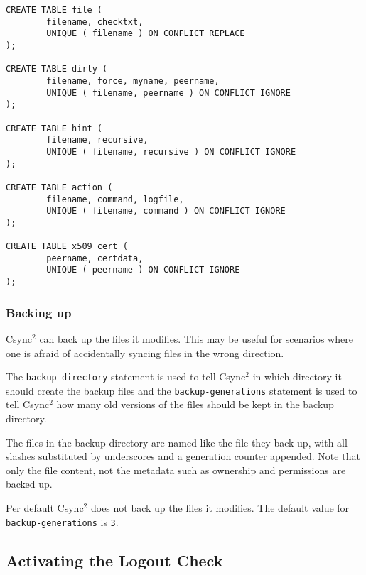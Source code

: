 \documentclass[a4paper,twocolumn]{article}
\def\csync2{{\sc Csync$^{2}$}}
\begin{document}
\begin{figure*}[t]
  \begin{center}
\begin{verbatim}
CREATE TABLE file (
        filename, checktxt,
        UNIQUE ( filename ) ON CONFLICT REPLACE
);

CREATE TABLE dirty (
        filename, force, myname, peername,
        UNIQUE ( filename, peername ) ON CONFLICT IGNORE
);

CREATE TABLE hint (
        filename, recursive,
        UNIQUE ( filename, recursive ) ON CONFLICT IGNORE
);

CREATE TABLE action (
        filename, command, logfile,
        UNIQUE ( filename, command ) ON CONFLICT IGNORE
);

CREATE TABLE x509_cert (
        peername, certdata,
        UNIQUE ( peername ) ON CONFLICT IGNORE
);
\end{verbatim}
  \end{center}
  \caption{The \csync2 database schema}
\end{figure*}


\subsubsection{Backing up}

\csync2 can back up the files it modifies. This may be useful for scenarios
where one is afraid of accidentally syncing files in the wrong direction.

The {\tt backup-directory} statement is used to tell \csync2 in which directory
it should create the backup files and the {\tt backup-generations} statement is
used to tell \csync2 how many old versions of the files should be kept in the
backup directory.

The files in the backup directory are named like the file they back up, with
all slashes substituted by underscores and a generation counter appended. Note
that only the file content, not the metadata such as ownership and permissions
are backed up.

Per default \csync2 does not back up the files it modifies. The default
value for {\tt backup-generations} is {\tt 3}.

\subsection{Activating the Logout Check}
\end{document}
